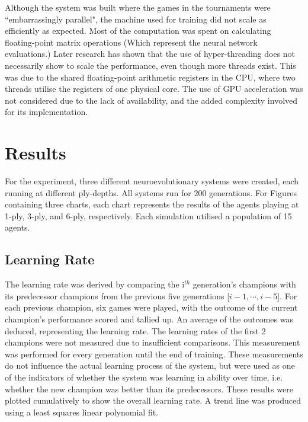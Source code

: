 \documentclass[12pt,a4paper]{article}
\begin{document}
        Although the system was built where the games in the tournaments were ``embarrassingly parallel", the machine used for training did not scale as efficiently as expected. Most of the computation was spent on calculating floating-point matrix operations (Which represent the neural network evaluations.) Later research has shown that the use of hyper-threading does not necessarily show to scale the performance, even though more threads exist. \cite{leng_empirical_2002} This was due to the shared floating-point arithmetic registers in the CPU, where two threads utilise the registers of one physical core. The use of GPU acceleration was not considered due to the lack of availability, and the added complexity involved for its implementation. 
    
\section{Results}
    

    For the experiment, three different neuroevolutionary systems were created, each running at different ply-depths. All systems run for 200 generations. For Figures containing three charts, each chart represents the results of the agents playing at 1-ply, 3-ply, and 6-ply, respectively. Each simulation utilised a population of 15 agents.

    \subsection{Learning Rate}
    
    The learning rate was derived by comparing the i$^{th}$ generation's champions with its predecessor champions from the previous five generations [$i-1, \cdots, i-5$]. For each previous champion, six games were played, with the outcome of the current champion's performance scored and tallied up. An average of the outcomes was deduced, representing the learning rate. The learning rates of the first 2 champions were not measured due to insufficient comparisons. This measurement was performed for every generation until the end of training. These measurements do not influence the actual learning process of the system, but were used as one of the indicators of whether the system was learning in ability over time, i.e. whether the new champion was better than its predecessors. These results were plotted cumulatively to show the overall learning rate. A trend line was produced using a least squares linear polynomial fit.
    
\end{document}
